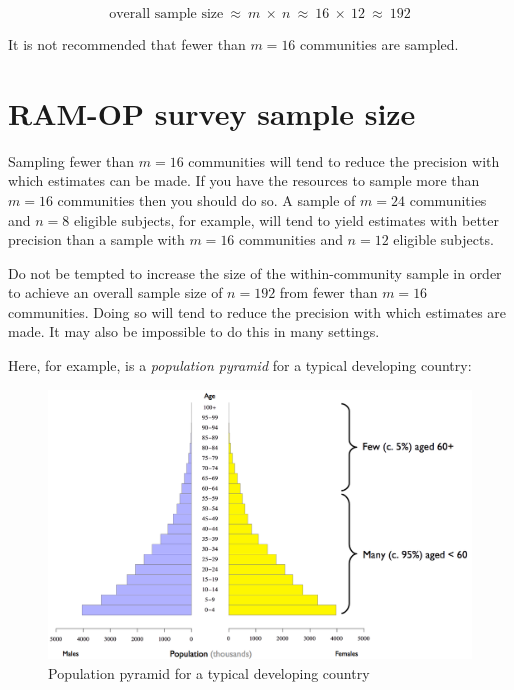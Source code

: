\documentclass[12pt,]{book}
\theoremstyle{definition}
\theoremstyle{definition}
\theoremstyle{definition}
\theoremstyle{remark}
\begin{document}
\[ \text{overall sample size} ~ \approx ~ m ~ \times ~ n ~ \approx ~ 16 ~ \times ~ 12 ~ \approx ~ 192 \]

It is not recommended that fewer than \(m = 16\) communities are
sampled.

\newpage

\hypertarget{ram-op-survey-sample-size-1}{%
\section{RAM-OP survey sample size}\label{ram-op-survey-sample-size-1}}

Sampling fewer than \(m = 16\) communities will tend to reduce the
precision with which estimates can be made. If you have the resources to
sample more than \(m = 16\) communities then you should do so. A sample
of \(m = 24\) communities and \(n = 8\) eligible subjects, for example,
will tend to yield estimates with better precision than a sample with
\(m = 16\) communities and \(n = 12\) eligible subjects.

Do not be tempted to increase the size of the within-community sample in
order to achieve an overall sample size of \(n = 192\) from fewer than
\(m = 16\) communities. Doing so will tend to reduce the precision with
which estimates are made. It may also be impossible to do this in many
settings.

Here, for example, is a \emph{population pyramid} for a typical
developing country:

\begin{figure}[h]

{\centering \includegraphics[width=16.67in]{figures/popPyramid1} 

}

\caption{Population pyramid for a typical developing country}\label{fig:sample2}
\end{figure}
\end{document}

